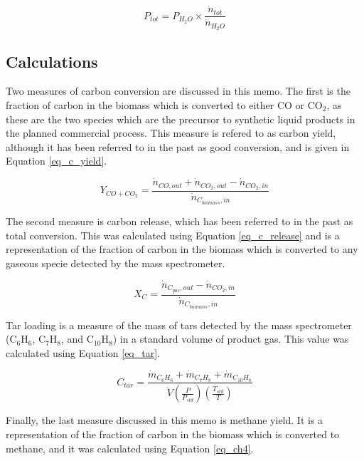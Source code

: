 \documentclass[11pt,twocolumn]{article}
\begin{document}
\begin{equation}
	P_{tot} = P_{H_2O} \times \frac{\dot{n}_{tot}}{\dot{n}_{H_2O}}
	\label{pressure}
\end{equation}



\subsection*{Calculations}

Two measures of carbon conversion are discussed in this memo.  The first is the fraction of carbon in the biomass which is converted to either CO or CO$_2$, as these are the two species which are the precursor to synthetic liquid products in the planned commercial process.  This measure is refered to as carbon yield, although it has been referred to in the past as good conversion, and is given in Equation \ref{eq_c_yield}.

\begin{equation}
	Y_{CO+CO_2} = \frac{\dot{n}_{CO,out}+\dot{n}_{CO_2,out} - \dot{n}_{CO_2,in}}{\dot{n}_{C_{biomass},in}}
	\label{eq_c_yield}
\end{equation}

The second measure is carbon release, which has been referred to in the past as total conversion.  This was calculated using Equation \ref{eq_c_release} and is a representation of the fraction of carbon in the biomass which is converted to any gaseous specie detected by the mass spectrometer.

\begin{equation}
	X_{C} = \frac{\dot{n}_{C_{gas},out}- \dot{n}_{CO_2,in}}{\dot{n}_{C_{biomass},in}}
	\label{eq_c_release}
\end{equation}

Tar loading is a measure of the mass of tars detected by the mass spectrometer (C$_6$H$_6$, C$_7$H$_8$, and C$_{10}$H$_8$) in a standard volume of product gas.  This value was calculated using Equation \ref{eq_tar}.

\begin{equation}
	C_{tar} = \frac{\dot{m}_{C_6H_6}+\dot{m}_{C_7H_8} + \dot{m}_{C_{10}H_8}}{\dot{V}(\frac{P}{P_{std}})(\frac{T_{std}}{T})}
	\label{eq_tar}
\end{equation}

Finally, the last measure discussed in this memo is methane yield.  It is a representation of the fraction of carbon in the biomass which is converted to methane, and it was calculated using Equation \ref{eq_ch4}.
\end{document}
